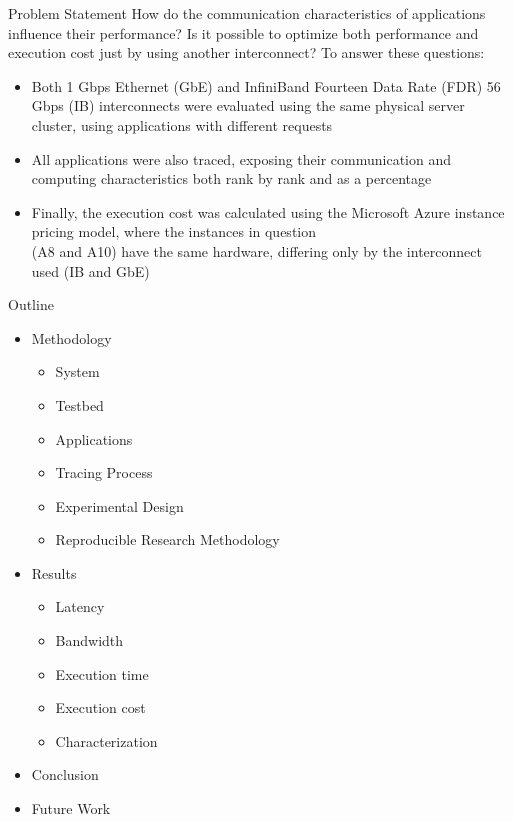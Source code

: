 \documentclass{beamer}
\begin{document}
\begin{frame}{Problem Statement}
How do the \alert{communication characteristics} of applications influence their \alert{performance}?
\pause \vfill
Is it possible to optimize both \alert{performance} and \alert{execution cost} just by using another interconnect?
\pause \vfill
To answer these questions:

\pause \vfill
\begin{itemize}
    \item Both \alert{1 Gbps Ethernet (GbE)} and \alert{InfiniBand Fourteen Data Rate (FDR) 56 Gbps (IB)} interconnects were evaluated using the same physical server cluster, using applications with different requests
\pause \vfill
    \item All applications were also \alert{traced}, exposing their communication and computing characteristics both rank by rank and as a percentage
\pause \vfill
    \item Finally, the \alert{execution cost} was calculated using the \alert{Microsoft Azure instance pricing model}, where the instances in question \\(A8 and A10) have the same hardware, differing only by the interconnect used (IB and GbE)
\end{itemize}
\vfill
    
\end{frame}
\begin{frame}{Outline}
\vfill
\Large
\begin{itemize}
\item Methodology
\begin{itemize}
\item System
\item Testbed
\item Applications
\item Tracing Process
\item Experimental Design
\item Reproducible Research Methodology
\end{itemize}
\end{itemize}
\begin{itemize}
\item Results
\begin{itemize}
    \item Latency
    \item Bandwidth
    \item Execution time
    \item Execution cost
    \item Characterization
\end{itemize}
\end{itemize}
\begin{itemize}
\item Conclusion
\item Future Work
\end{itemize}
\end{frame}
\end{document}
